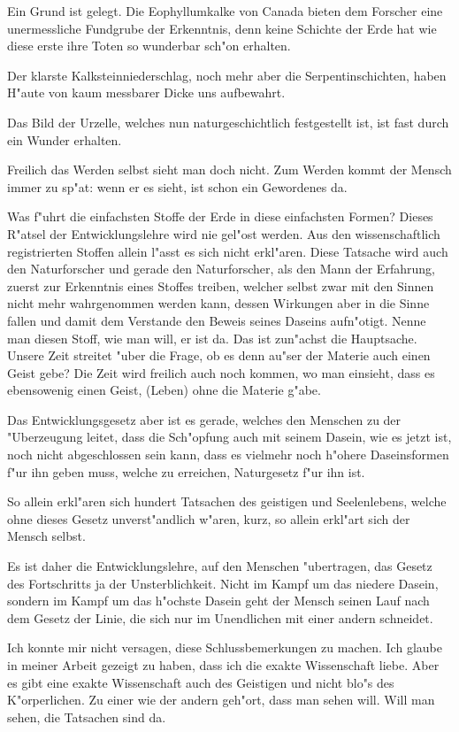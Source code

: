 \documentclass[a4paper, 11pt, oneside, german]{article}
\begin{document}
Ein Grund ist gelegt. Die Eophyllumkalke von Canada bieten dem Forscher eine unermessliche Fundgrube der Erkenntnis, denn keine Schichte der Erde hat wie diese erste ihre Toten so wunderbar sch"on erhalten.

Der klarste Kalksteinniederschlag, noch mehr aber die Serpentinschichten, haben H"aute von kaum messbarer Dicke uns aufbewahrt.

Das Bild der Urzelle, welches nun naturgeschichtlich festgestellt ist, ist fast durch ein Wunder erhalten.

Freilich das Werden selbst sieht man doch nicht. Zum Werden kommt der Mensch immer zu sp"at: wenn er es sieht, ist schon ein Gewordenes da.

Was f"uhrt die einfachsten Stoffe der Erde in diese einfachsten Formen? Dieses R"atsel der Entwicklungslehre wird nie gel"ost werden. Aus den wissenschaftlich registrierten Stoffen allein l"asst es sich nicht erkl"aren. Diese Tatsache wird auch den Naturforscher und gerade den Naturforscher, als den Mann der Erfahrung, zuerst zur Erkenntnis eines Stoffes treiben, welcher selbst zwar mit den Sinnen nicht mehr wahrgenommen werden kann, dessen Wirkungen aber in die Sinne fallen und damit dem Verstande den Beweis seines Daseins aufn"otigt. Nenne man diesen Stoff, wie man will, er ist da. Das ist zun"achst die Hauptsache. Unsere Zeit streitet "uber die Frage, ob es denn au"ser der Materie auch einen Geist gebe? Die Zeit wird freilich auch noch kommen, wo man einsieht, dass es ebensowenig einen Geist, (Leben) ohne die Materie g"abe.

Das Entwicklungsgesetz aber ist es gerade, welches den Menschen zu der "Uberzeugung leitet, dass die Sch"opfung auch mit seinem Dasein, wie es jetzt ist, noch nicht abgeschlossen sein kann, dass es vielmehr noch h"ohere Daseinsformen f"ur ihn geben muss, welche zu erreichen, Naturgesetz f"ur ihn ist.

So allein erkl"aren sich hundert Tatsachen des geistigen und Seelenlebens, welche ohne dieses Gesetz unverst"andlich w"aren, kurz, so allein erkl"art sich der Mensch selbst.

Es ist daher die Entwicklungslehre, auf den Menschen "ubertragen, das Gesetz des Fortschritts ja der Unsterblichkeit. Nicht im Kampf um das niedere Dasein, sondern im Kampf um das h"ochste Dasein geht der Mensch seinen Lauf nach dem Gesetz der Linie, die sich nur im Unendlichen mit einer andern schneidet.

Ich konnte mir nicht versagen, diese Schlussbemerkungen zu machen. Ich glaube in meiner Arbeit gezeigt zu haben, dass ich die exakte Wissenschaft liebe. Aber es gibt eine exakte Wissenschaft auch des Geistigen und nicht blo"s des K"orperlichen. Zu einer wie der andern geh"ort, dass man sehen will. Will man sehen, die Tatsachen sind da.
\end{document}
